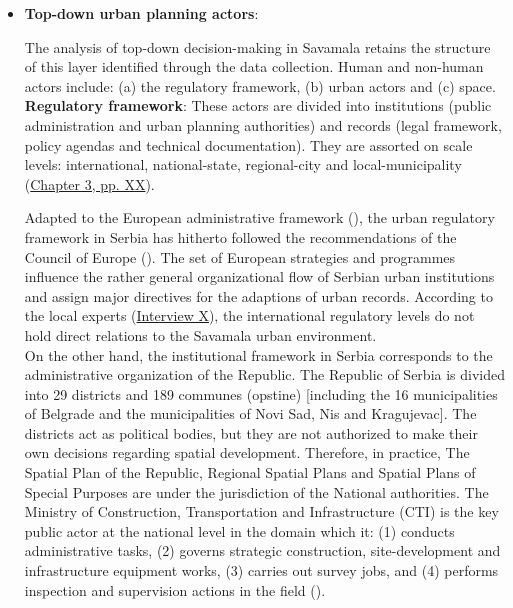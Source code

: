 \documentclass[11pt]{report}
\begin{document}
\begin{itemize}
\item \textbf{Top-down urban planning actors}:

The analysis of top-down decision-making in Savamala retains the structure of this layer identified through the data collection.
Human and non-human actors include:
(a) the regulatory framework,
(b) urban actors
and
(c) space.
\\

\textbf{Regulatory framework}: 
These actors are divided into institutions (public administration and urban planning authorities) and records (legal framework, policy agendas and technical documentation).
They are assorted on scale levels: international, national-state, regional-city and local-municipality (\href{ref}{Chapter 3, pp. XX}). 

Adapted to the European administrative framework (\cite{Official gazette RS 09/2014}), the urban regulatory framework in Serbia has hitherto followed the recommendations of the Council of Europe 
(\href{ref}{\citealt{ministarstvo_prostora_urbani_2014}}). The set of European strategies and programmes influence the rather general organizational flow of Serbian urban institutions and assign major directives for the adaptions of urban records. 
According to the local experts
(\href{InterviewX}{Interview X}),
the international regulatory levels do not hold direct relations to the Savamala urban environment.
\\

On the other hand, the institutional framework in Serbia corresponds to the administrative organization of the Republic. The Republic of Serbia is divided into 29 districts and 189 communes (opstine) [including the 16 municipalities of Belgrade and the  municipalities of Novi Sad, Nis and Kragujevac]. The districts act as political bodies, but they are not authorized to make their own decisions regarding spatial development. Therefore, in practice, The Spatial Plan of the Republic, Regional Spatial Plans and Spatial Plans of Special Purposes are under the jurisdiction of the National authorities. The Ministry of Construction, Transportation and Infrastructure (CTI) is the key public actor at the national level in the domain which it: (1) conducts administrative tasks, (2) governs strategic construction, site-development and infrastructure equipment works, (3) carries out survey jobs, and (4) performs inspection and supervision actions in the field (\href{Maksic}{\citealt{maksic_european_2012}}).
\\


\end{itemize}
\end{document}
